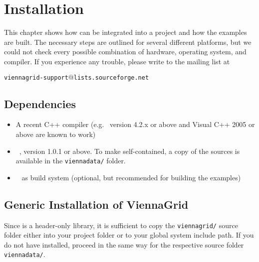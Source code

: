\chapter{Installation}

This chapter shows how {\ViennaGrid} can be integrated into a project and how
the examples are built. The necessary steps are outlined for several different
platforms, but we could not check every possible combination of hardware,
operating system, and compiler. If you experience any trouble, please write to
the mailing list at \\
\begin{center}
\texttt{viennagrid-support$@$lists.sourceforge.net} 
\end{center}


\section{Dependencies}
\label{dependencies}

\begin{itemize}
 \item A recent C++ compiler (e.g.~{\GCC} version 4.2.x or above and Visual C++
2005 or above are known to work)
 \item {\ViennaData}~\cite{ViennaData}, version 1.0.1 or above. To make {\ViennaGrid} self-contained, a copy of the {\ViennaData} sources is available in the \lstinline|viennadata/| folder.
 \item {\CMake}~\cite{cmake} as build system (optional, but recommended
for building the examples)
\end{itemize}


\section{Generic Installation of ViennaGrid} \label{sec:viennagrid-installation}
Since {\ViennaGrid} is a header-only library, it is sufficient to copy the 
\lstinline|viennagrid/| source folder either into your project folder or to your global system
include path. If you do not have {\ViennaData} installed, proceed in the same way for the respective source folder \lstinline|viennadata/|. 

